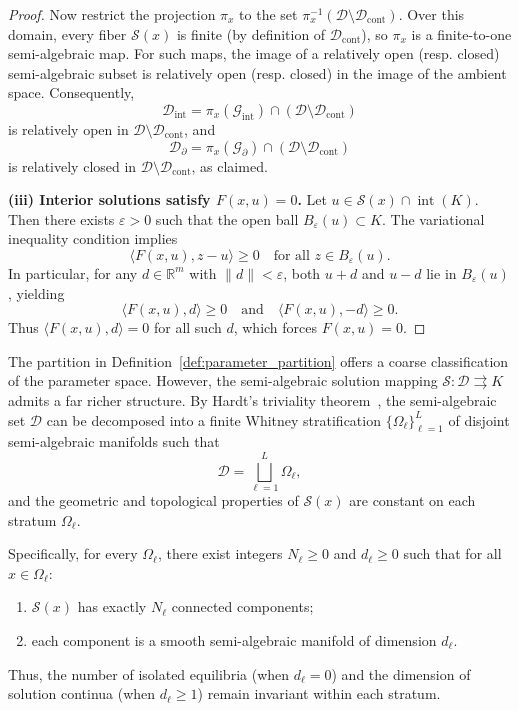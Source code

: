 \documentclass[sn-basic,Numbered]{sn-jnl}
\theoremstyle{thmstyleone}%
\begin{document}
\begin{proof}
Now restrict the projection $\pi_x$ to the set $\pi_x^{-1}(\mathcal{D} \setminus \mathcal{D}_{\mathrm{cont}})$. Over this domain, every fiber $\mathcal{S}(x)$ is finite (by definition of $\mathcal{D}_{\mathrm{cont}}$), so $\pi_x$ is a finite-to-one semi-algebraic map. For such maps, the image of a relatively open (resp. closed) semi-algebraic subset is relatively open (resp. closed) in the image of the ambient space. Consequently,
\[
\mathcal{D}_{\mathrm{int}} = \pi_x(\mathcal{G}_{\mathrm{int}}) \cap (\mathcal{D} \setminus \mathcal{D}_{\mathrm{cont}})
\]
is relatively open in $\mathcal{D} \setminus \mathcal{D}_{\mathrm{cont}}$, and
\[
\mathcal{D}_{\partial} = \pi_x(\mathcal{G}_{\partial}) \cap (\mathcal{D} \setminus \mathcal{D}_{\mathrm{cont}})
\]
is relatively closed in $\mathcal{D} \setminus \mathcal{D}_{\mathrm{cont}}$, as claimed.

\smallskip
\noindent\textbf{(iii) Interior solutions satisfy $F(x,u) = 0$.}
Let $u \in \mathcal{S}(x) \cap \operatorname{int}(K)$. Then there exists $\varepsilon > 0$ such that the open ball $B_\varepsilon(u) \subset K$. The variational inequality condition implies
\[
\langle F(x, u), z - u \rangle \ge 0 \quad \text{for all } z \in B_\varepsilon(u).
\]
In particular, for any $d \in \mathbb{R}^m$ with $\|d\| < \varepsilon$, both $u + d$ and $u - d$ lie in $B_\varepsilon(u)$, yielding
\[
\langle F(x, u), d \rangle \ge 0 \quad \text{and} \quad \langle F(x, u), -d \rangle \ge 0.
\]
Thus $\langle F(x, u), d \rangle = 0$ for all such $d$, which forces $F(x, u) = 0$.
\end{proof}



The partition in Definition~\ref{def:parameter_partition} offers a coarse classification of the parameter space. However, the semi-algebraic solution mapping $\mathcal{S}: \mathcal{D} \rightrightarrows K$ admits a far richer structure. By Hardt's triviality theorem~\cite{hardt1980semi}, the semi-algebraic set $\mathcal{D}$ can be decomposed into a finite Whitney stratification $\{\Omega_\ell\}_{\ell=1}^L$ of disjoint semi-algebraic manifolds such that
\[
    \mathcal{D} = \bigsqcup_{\ell=1}^L \Omega_\ell,
\]
and the geometric and topological properties of $\mathcal{S}(x)$ are constant on each stratum $\Omega_\ell$.

Specifically, for every $\Omega_\ell$, there exist integers $N_\ell \geq 0$ and $d_\ell \geq 0$ such that for all $x \in \Omega_\ell$:
\begin{enumerate}[label=(\roman*)]
    \item $\mathcal{S}(x)$ has exactly $N_\ell$ connected components;
    \item each component is a smooth semi-algebraic manifold of dimension $d_\ell$.
\end{enumerate}
Thus, the number of isolated equilibria (when $d_\ell = 0$) and the dimension of solution continua (when $d_\ell \geq 1$) remain invariant within each stratum.
\end{document}

